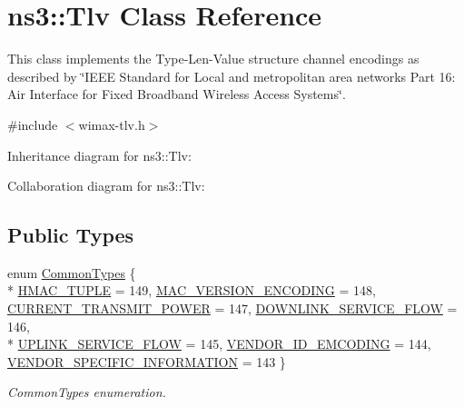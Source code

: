 \hypertarget{classns3_1_1Tlv}{}\section{ns3\+:\+:Tlv Class Reference}
\label{classns3_1_1Tlv}


This class implements the Type-\/\+Len-\/\+Value structure channel encodings as described by \char`\"{}\+I\+E\+E\+E Standard for
\+Local and metropolitan area networks Part 16\+: Air Interface for Fixed Broadband Wireless Access Systems\char`\"{}.  




{\ttfamily \#include $<$wimax-\/tlv.\+h$>$}



Inheritance diagram for ns3\+:\+:Tlv\+:


Collaboration diagram for ns3\+:\+:Tlv\+:
\subsection*{Public Types}
\begin{DoxyCompactItemize}
\item 
enum \hyperlink{classns3_1_1Tlv_ab275ea003645d46aada8e2b351de90e3}{Common\+Types} \{ \\*
\hyperlink{classns3_1_1Tlv_ab275ea003645d46aada8e2b351de90e3a98f9ddf5aa70b719dd404ecb9897d7d0}{H\+M\+A\+C\+\_\+\+T\+U\+P\+LE} = 149, 
\hyperlink{classns3_1_1Tlv_ab275ea003645d46aada8e2b351de90e3aa1dd3a9930fedc965c625fa2568d7d29}{M\+A\+C\+\_\+\+V\+E\+R\+S\+I\+O\+N\+\_\+\+E\+N\+C\+O\+D\+I\+NG} = 148, 
\hyperlink{classns3_1_1Tlv_ab275ea003645d46aada8e2b351de90e3a79ba3aacb5bca9a9df3d65068f1d8a59}{C\+U\+R\+R\+E\+N\+T\+\_\+\+T\+R\+A\+N\+S\+M\+I\+T\+\_\+\+P\+O\+W\+ER} = 147, 
\hyperlink{classns3_1_1Tlv_ab275ea003645d46aada8e2b351de90e3a75b57001056f0b9395e079873cb38f1d}{D\+O\+W\+N\+L\+I\+N\+K\+\_\+\+S\+E\+R\+V\+I\+C\+E\+\_\+\+F\+L\+OW} = 146, 
\\*
\hyperlink{classns3_1_1Tlv_ab275ea003645d46aada8e2b351de90e3a3b5488fc87cf6e32674c512bbf6bbb84}{U\+P\+L\+I\+N\+K\+\_\+\+S\+E\+R\+V\+I\+C\+E\+\_\+\+F\+L\+OW} = 145, 
\hyperlink{classns3_1_1Tlv_ab275ea003645d46aada8e2b351de90e3a480d5439b60bdb46b43b38503a3bafdb}{V\+E\+N\+D\+O\+R\+\_\+\+I\+D\+\_\+\+E\+M\+C\+O\+D\+I\+NG} = 144, 
\hyperlink{classns3_1_1Tlv_ab275ea003645d46aada8e2b351de90e3aa635aca273fbc5a3d4d63d69bd7b665f}{V\+E\+N\+D\+O\+R\+\_\+\+S\+P\+E\+C\+I\+F\+I\+C\+\_\+\+I\+N\+F\+O\+R\+M\+A\+T\+I\+ON} = 143
 \}\begin{DoxyCompactList}\small\item\em Common\+Types enumeration. \end{DoxyCompactList}
\end{DoxyCompactItemize}
